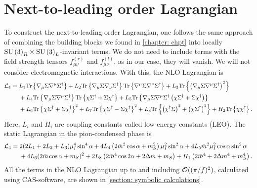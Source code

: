 \section{Next-to-leading order Lagrangian}
\label{section: nlo chpt}


To construct the next-to-leading order Lagrangian, one follows the same approach of combining the building blocks we found in \autoref{chapter: chpt} into locally $\text{SU}\left(3\right)_R\times\text{SU}\left(3\right)_L$-invariant terms.
We do not need to include terms with the field strength tensors $f_{\mu\nu}^{(r)}$ and $f_{\mu\nu}^{(l)}$, as in our case, they will vanish.
We will not consider electromagnetic interactions.
With this, the NLO Lagrangian is~\autocite{gasserChiralPerturbationTheory1985}
%
\begin{align}
    \label{NLO Lagrangian three flavor}
    \nonumber
    \mathcal{L}_4 
    ={} &
    L_1\text{Tr} \left\{ \nabla_\mu \Sigma \nabla^\mu \Sigma^\dagger \right\}
    + L_2 \text{Tr} \left\{ \nabla_\mu \Sigma \nabla_\nu \Sigma^\dagger \right\} 
    \text{Tr} \left\{ \nabla^\mu \Sigma \nabla^\nu \Sigma^\dagger \right\}
    + L_3 \text{Tr} \left\{ \left(\nabla_\mu \Sigma \nabla^\mu \Sigma^\dagger\right)^2 \right\} \\ \nonumber
    & + L_4 \text{Tr} \left\{ \nabla_\mu \Sigma \nabla^\mu \Sigma^\dagger \right\} 
    \text{Tr} \left\{ \chi \Sigma^\dagger + \Sigma \chi^\dagger \right\}
    + L_5 \text{Tr} \left\{ 
        \nabla_\mu \Sigma \nabla^\mu \Sigma^\dagger 
        \left(\chi \Sigma^\dagger + \Sigma \chi^\dagger\right)
     \right\}\\
    &+ L_6 \text{Tr} \left\{ \chi \Sigma^\dagger + \Sigma \chi^\dagger \right\}^2 
     + L_7 \text{Tr} \left\{ \chi \Sigma^\dagger - \Sigma \chi^\dagger \right\}^2
    + L_8 \text{Tr} \left\{  \left(\chi^\dagger \Sigma \right)^2 + \left(\chi \Sigma^\dagger \right)^2 \right\}
    + H_2 \text{Tr} \left\{ \chi \chi^\dagger \right\}.
\end{align}
%
Here, $L_i$ and $H_i$ are coupling constants called low energy constants (LEO).
The static Lagrangian in the pion-condensed phase is
%
\begin{align}
    \nonumber
    \mathcal{L}_4
    = {}&
    2(2L_1 + 2L_2 + L_3) \mu_I^4 \sin^4\alpha
    + 4  L_4 \left( 2 \bar m^2 \cos\alpha + m_S^2 \right) \mu_I^2\sin^2\alpha
    + 4 L_5 \bar m^2 \mu_I^2 \cos\alpha \sin^2 \alpha 
    \\ & 
    + 4 L_6 (2\bar m\cos\alpha + m_S)^2
    + 2 L_8 \left(2 \bar m^4 \cos2\alpha + 2 \Delta m + m_S\right)
    + H_1 \left(2\bar m^4 + 2\Delta m^4 + m_S^4 \right).
\end{align}
%
All the terms in the NLO Lagrangian up to and including $\mathcal O((\pi/f)^2)$, calculated using CAS-software, are shown in \autoref{section: symbolic calculations}.

